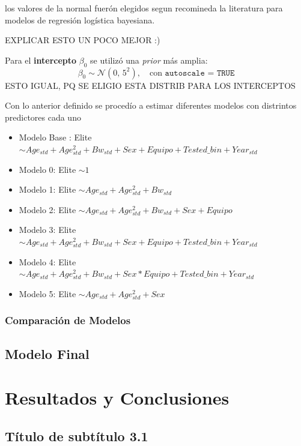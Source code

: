 \documentclass[letter]{article}
\begin{document}
los valores de la normal fuerón elegidos segun recomineda la literatura para modelos de regresión logística bayesiana. 

EXPLICAR ESTO UN POCO MEJOR :)

Para el \textbf{intercepto} $\beta_0$ se utilizó una \textit{prior} más amplia:
\begin{equation}
    \beta_0 \sim \mathcal{N}(0, \, 5^2), \quad \text{con } \texttt{autoscale = TRUE}
    \label{eq:prior_int}
\end{equation}
ESTO IGUAL, PQ SE ELIGIO ESTA DISTRIB PARA LOS INTERCEPTOS

Con lo anterior definido se procedío a estimar diferentes modelos con distrintos predictores cada uno


\begin{itemize}
    \item Modelo Base : Elite $\sim Age_{std} + Age_{std}^2 + Bw_{std} + Sex + Equipo + Tested\_bin + Year_{std}$
    \item Modelo 0: Elite $\sim 1$
    \item Modelo 1: Elite $\sim Age_{std} + Age_{std}^2 + Bw_{std}$
    \item Modelo 2: Elite $\sim Age_{std} + Age_{std}^2 + Bw_{std} + Sex + Equipo$
    \item Modelo 3: Elite $\sim Age_{std} + Age_{std}^2 + Bw_{std} + Sex + Equipo + Tested\_bin + Year_{std}$
    \item Modelo 4: Elite $\sim Age_{std} + Age_{std}^2 + Bw_{std} + Sex * Equipo + Tested\_bin + Year_{std}$
    \item Modelo 5: Elite $\sim Age_{std} + Age_{std}^2 + Sex$
\end{itemize}

\subsubsection*{Comparación de Modelos}

\subsection{Modelo Final}


\section{Resultados y Conclusiones}

\subsection{Título de subtítulo 3.1}
\end{document}
